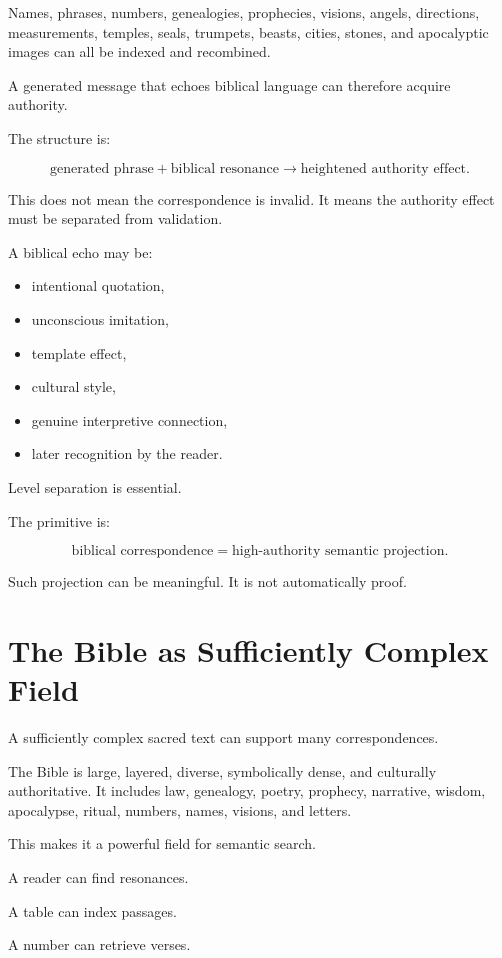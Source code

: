 \documentclass[11pt]{book}
\begin{document}
Names, phrases, numbers, genealogies, prophecies, visions, angels, directions, measurements, temples, seals, trumpets, beasts, cities, stones, and apocalyptic images can all be indexed and recombined.

A generated message that echoes biblical language can therefore acquire authority.

The structure is:

\[
\text{generated phrase}
+
\text{biblical resonance}
\rightarrow
\text{heightened authority effect}.
\]

This does not mean the correspondence is invalid. It means the authority effect must be separated from validation.

A biblical echo may be:

\begin{itemize}
    \item intentional quotation,
    \item unconscious imitation,
    \item template effect,
    \item cultural style,
    \item genuine interpretive connection,
    \item later recognition by the reader.
\end{itemize}

Level separation is essential.

The primitive is:

\[
\text{biblical correspondence} = \text{high-authority semantic projection}.
\]

Such projection can be meaningful. It is not automatically proof.

\section{The Bible as Sufficiently Complex Field}

A sufficiently complex sacred text can support many correspondences.

The Bible is large, layered, diverse, symbolically dense, and culturally authoritative. It includes law, genealogy, poetry, prophecy, narrative, wisdom, apocalypse, ritual, numbers, names, visions, and letters.

This makes it a powerful field for semantic search.

A reader can find resonances.

A table can index passages.

A number can retrieve verses.
\end{document}
